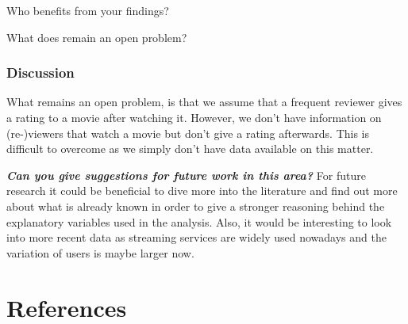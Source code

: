 \documentclass[
  english,
  man,floatsintext]{apa6}
\begin{document}
Who benefits from your findings?

What does remain an open problem?

\hypertarget{discussion}{%
\subsubsection{Discussion}\label{discussion}}

What remains an open problem, is that we assume that a frequent reviewer gives a rating to a movie after watching it. However, we don't have information on (re-)viewers that watch a movie but don't give a rating afterwards. This is difficult to overcome as we simply don't have data available on this matter.

\textbf{\emph{Can you give suggestions for future work in this area?}}
For future research it could be beneficial to dive more into the literature and find out more about what is already known in order to give a stronger reasoning behind the explanatory variables used in the analysis. Also, it would be interesting to look into more recent data as streaming services are widely used nowadays and the variation of users is maybe larger now.

\newpage

\hypertarget{references}{%
\section{References}\label{references}}

\begingroup
\setlength{\parindent}{-0.5in}
\setlength{\leftskip}{0.5in}
\end{document}
